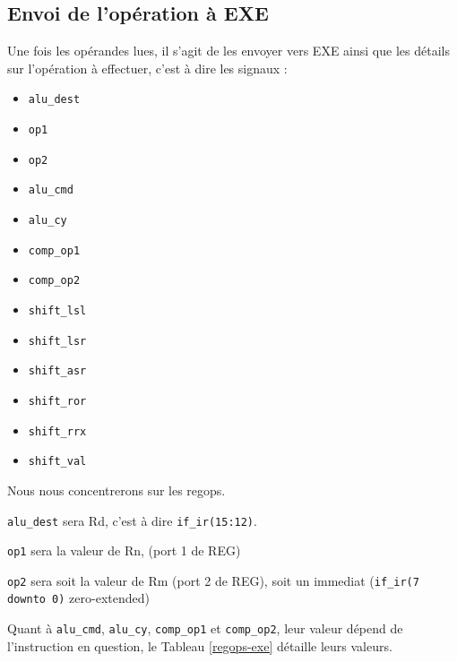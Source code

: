 \documentclass{article}
\begin{document}


\subsection{Envoi de l'opération à EXE}

Une fois les opérandes lues, il s'agit de les envoyer vers EXE ainsi que les détails
sur l'opération à effectuer, c'est à dire les signaux :
\begin{itemize}
  \item \texttt{alu\_dest}
  \item \texttt{op1}
  \item \texttt{op2}
  \item \texttt{alu\_cmd}
  \item \texttt{alu\_cy}
  \item \texttt{comp\_op1}
  \item \texttt{comp\_op2}
  \item \texttt{shift\_lsl}
  \item \texttt{shift\_lsr}
  \item \texttt{shift\_asr}
  \item \texttt{shift\_ror}
  \item \texttt{shift\_rrx}
  \item \texttt{shift\_val}
\end{itemize}

Nous nous concentrerons sur les regops.

\texttt{alu\_dest} sera Rd, c'est à dire \texttt{if\_ir(15:12)}.

\texttt{op1} sera la valeur de Rn, (port 1 de REG)

\texttt{op2} sera soit la valeur de Rm (port 2 de REG), soit un immediat (\texttt{if\_ir(7 downto 0)} zero-extended)

Quant à \texttt{alu\_cmd}, \texttt{alu\_cy}, \texttt{comp\_op1} et \texttt{comp\_op2},
leur valeur dépend de l'instruction en question,
le Tableau \ref{regops-exe} détaille leurs valeurs.
\end{document}

